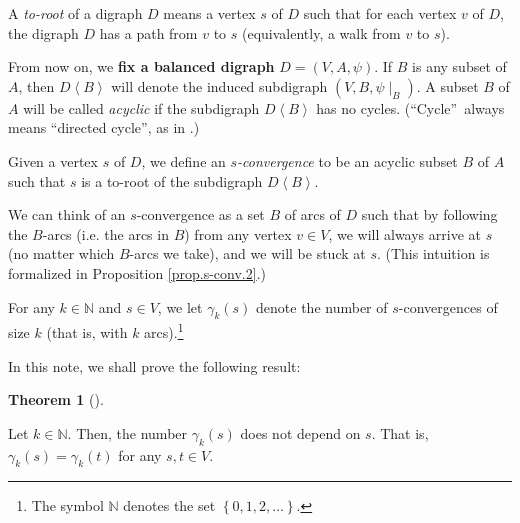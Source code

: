 \documentclass[numbers=enddot,12pt,final,onecolumn,notitlepage]{scrartcl}%
\theoremstyle{definition}
\newtheorem{theo}{Theorem}[section]
\newenvironment{theorem}[1][]
{\begin{theo}[#1]\begin{leftbar}}
{\end{leftbar}\end{theo}}
\theoremstyle{plainsl}
\begin{document}
A \emph{to-root} of a digraph $D$ means a vertex $s$ of $D$ such that for each
vertex $v$ of $D$, the digraph $D$ has a path from $v$ to $s$ (equivalently, a
walk from $v$ to $s$).

From now on, we \textbf{fix a balanced digraph} $D=(V,A,\psi)$. If $B$ is any
subset of $A$, then $D\left\langle B\right\rangle $ will denote the induced
subdigraph $\left(  V,B,\psi\mid_{B}\right)  $. A subset $B$ of $A$ will be
called \emph{acyclic} if the subdigraph $D\left\langle B\right\rangle $ has no
cycles. (\textquotedblleft Cycle\textquotedblright\ always means
\textquotedblleft directed cycle\textquotedblright, as in \cite[Definition
4.5.1]{22s}.)

Given a vertex $s$ of $D$, we define an \emph{$s$-convergence} to be an
acyclic subset $B$ of $A$ such that $s$ is a to-root of the subdigraph $D
\left\langle B \right\rangle $.

We can think of an $s$-convergence as a set $B$ of arcs of $D$ such that by
following the $B$-arcs (i.e. the arcs in $B$) from any vertex $v\in V$, we
will always arrive at $s$ (no matter which $B$-arcs we take), and we will be
stuck at $s$. (This intuition is formalized in Proposition \ref{prop.s-conv.2}.)

For any $k\in\mathbb{N}$ and $s\in V$, we let $\gamma_{k}\left(  s\right)  $
denote the number of $s$-convergences of size $k$ (that is, with $k$
arcs).\footnote{The symbol $\mathbb{N}$ denotes the set $\left\{
0,1,2,\ldots\right\}  $.}

In this note, we shall prove the following result:

\begin{theorem}
\label{thm.balgamma}Let $k\in\mathbb{N}$. Then, the number $\gamma_{k}\left(
s\right)  $ does not depend on $s$. That is, $\gamma_{k}\left(  s\right)
=\gamma_{k}\left(  t\right)  $ for any $s,t\in V$.
\end{theorem}
\end{document}
